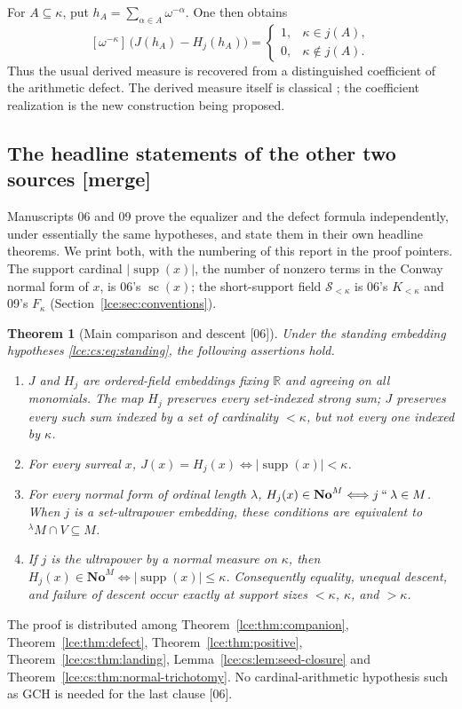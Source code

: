 \documentclass[11pt,letterpaper]{article}
\numberwithin{equation}{section}
\newtheorem{theorem}{Theorem}[section]
\theoremstyle{definition}
\theoremstyle{remark}
\newcommand{\No}{\mathbf{No}}
\newcommand{\R}{\mathbb R}
\newcommand{\supp}{\operatorname{supp}}
\newcommand{\Sk}{\mathscr S_{<\kappa}}
\newcommand{\imset}[2]{#1\mathbin{``}#2}
\newcommand{\coef}[2]{[\omega^{#1}]\,#2}
\newcommand{\abs}[1]{\lvert#1\rvert}
\newcommand{\thref}[1]{Theorem~\ref{#1}}
\newcommand{\leref}[1]{Lemma~\ref{#1}}
\newcommand{\src}[1]{\textup{\textsf{\small[#1]}}}%
\newcommand{\mergetag}{\textup{\textsf{\small[merge]}}}%
\begin{document}
For $A\subseteq\kappa$, put $h_A=\sum_{\alpha\in A}\omega^{-\alpha}$.
One then obtains
\begin{equation}\label{lce:eq:Uintro}
 \coef{-\kappa}{\bigl(J(h_A)-H_j(h_A)\bigr)}
    =\begin{cases}1,&\kappa\in j(A),\\0,&\kappa\notin j(A).
      \end{cases}
\end{equation}
Thus the usual derived measure is recovered from a distinguished coefficient
of the arithmetic defect. The derived measure itself is classical
\cite{Neeman}; the coefficient realization is the new construction being
proposed.

\subsection{The headline statements of the other two sources \mergetag}
\label{lce:sub:headlines}
Manuscripts 06 and 09 prove the equalizer and the defect formula
independently, under essentially the same hypotheses, and state them in
their own headline theorems. We print both, with the numbering of this
report in the proof pointers. The support cardinal $\abs{\supp(x)}$, the
number of nonzero terms in the Conway normal form of $x$, is 06's
$\operatorname{sc}(x)$; the short-support field $\Sk$ is 06's $K_{<\kappa}$
and 09's $F_\kappa$ (Section~\ref{lce:sec:conventions}).

\begin{theorem}[Main comparison and descent \src{06}]\label{lce:cs:thm:overview}
Under the standing embedding hypotheses \eqref{lce:cs:eq:standing}, the
following assertions hold.
\begin{enumerate}[label=\textup{(\roman*)}]
\item $J$ and $H_j$ are ordered-field embeddings fixing $\R$ and agreeing
on all monomials. The map $H_j$ preserves every set-indexed strong sum;
$J$ preserves every such sum indexed by a set of cardinality $<\kappa$,
but not every one indexed by $\kappa$.
\item For every surreal $x$,
$J(x)=H_j(x)\Longleftrightarrow\abs{\supp(x)}<\kappa$.
\item For every normal form of ordinal length $\lambda$,
$H_j(x)\in\No^M\Longleftrightarrow\imset j\lambda\in M$.
When $j$ is a set-ultrapower embedding, these conditions are equivalent
to ${}^{\lambda}M\cap V\subseteq M$.
\item If $j$ is the ultrapower by a normal measure on $\kappa$, then
$H_j(x)\in\No^M\Longleftrightarrow\abs{\supp(x)}\le\kappa$.
Consequently equality, unequal descent, and failure of descent occur
exactly at support sizes $<\kappa$, $\kappa$, and $>\kappa$.
\end{enumerate}
\end{theorem}
The proof is distributed among \thref{lce:thm:companion},
\thref{lce:thm:defect}, \thref{lce:thm:positive},
\thref{lce:cs:thm:landing}, \leref{lce:cs:lem:seed-closure} and
\thref{lce:cs:thm:normal-trichotomy}. No cardinal-arithmetic hypothesis such
as GCH is needed for the last clause \src{06}.
\end{document}
